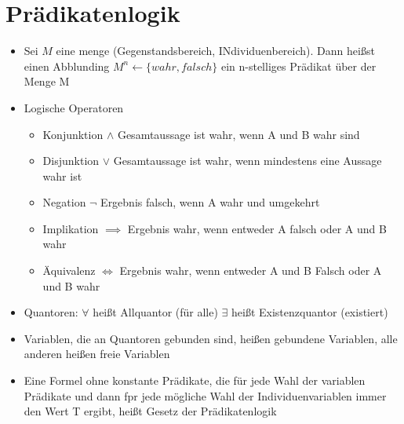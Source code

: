\documentclass[10pt,a5paper]{article}
\begin{document}
\section{Prädikatenlogik}
\begin{itemize}
\item Sei \ensuremath{M} eine menge (Gegenstandsbereich, INdividuenbereich). Dann heißst einen Abblunding \ensuremath{M^n\leftarrow \{wahr,falsch\}} ein n-stelliges Prädikat über der Menge M
\item Logische Operatoren\begin{itemize}
\item Konjunktion \ensuremath{\land}
\subitem Gesamtaussage ist wahr, wenn A und B wahr sind
\item Disjunktion \ensuremath{\lor}
\subitem Gesamtaussage ist wahr, wenn mindestens eine Aussage wahr ist
\item Negation \ensuremath{\lnot}
\subitem Ergebnis falsch, wenn A wahr und umgekehrt
\item Implikation \ensuremath{\implies}
\subitem Ergebnis wahr, wenn entweder A falsch oder A und B wahr
\item Äquivalenz \ensuremath{\iff}
\subitem Ergebnis wahr, wenn entweder A und B Falsch oder A und B wahr
\end{itemize}
\item Quantoren:
\subitem \ensuremath{\forall} heißt Allquantor (für alle)
\subitem \ensuremath{\exists} heißt Existenzquantor (existiert)
\item Variablen, die an Quantoren gebunden sind, heißen gebundene Variablen, alle anderen heißen freie Variablen
\item Eine Formel ohne konstante Prädikate, die für jede Wahl der variablen Prädikate und dann fpr jede mögliche Wahl der Individuenvariablen immer den Wert T ergibt, heißt Gesetz der Prädikatenlogik
\end{itemize}
\end{document}
